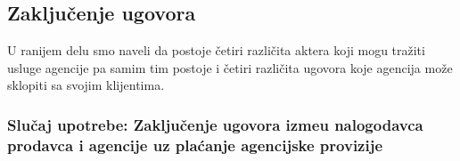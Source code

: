 \documentclass[20pt]{article}
\begin{document}
\newpage
\subsection{\bfseries \Large Zaklju\v {c}enje ugovora}
\setlength{\parindent}{1cm}
\fontsize{13}{18} \selectfont 


\indent U ranijem delu smo naveli da postoje \v {c}etiri razli\v {c}ita aktera koji mogu tra\v {z}iti usluge agencije pa samim tim postoje i \v {c}etiri razli\v {c}ita ugovora koje agencija mo\v {z}e sklopiti sa svojim klijentima. \\ 
\subsubsection{\bfseries \large Slu\v{c}aj upotrebe: Zaklju\v {c}enje ugovora izme\dj u nalogodavca prodavca i agencije uz pla\' canje agencijske provizije}
\end{document}
